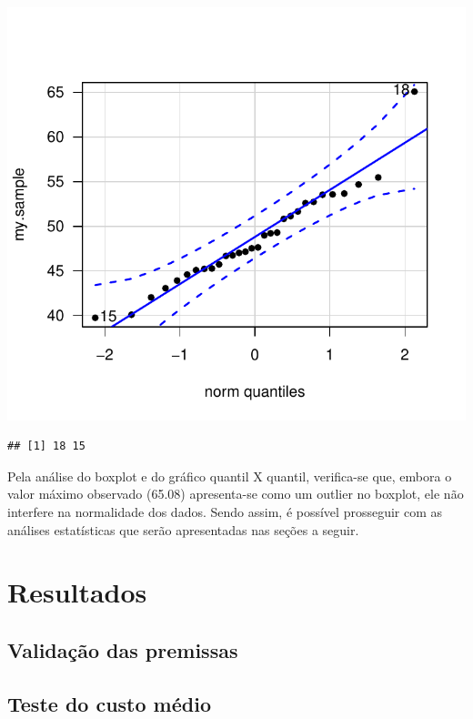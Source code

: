 \documentclass[]{article}
\begin{document}
\includegraphics{CS01report_maressa_files/figure-latex/plot1-1.pdf}

\begin{verbatim}
## [1] 18 15
\end{verbatim}

Pela análise do boxplot e do gráfico quantil X quantil, verifica-se que,
embora o valor máximo observado (65.08) apresenta-se como um outlier no
boxplot, ele não interfere na normalidade dos dados. Sendo assim, é
possível prosseguir com as análises estatísticas que serão apresentadas
nas seções a seguir.

\hypertarget{resultados}{%
\section{Resultados}\label{resultados}}

\hypertarget{validacao-das-premissas}{%
\subsection{Validação das premissas}\label{validacao-das-premissas}}

\hypertarget{teste-do-custo-medio}{%
\subsection{Teste do custo médio}\label{teste-do-custo-medio}}
\end{document}
